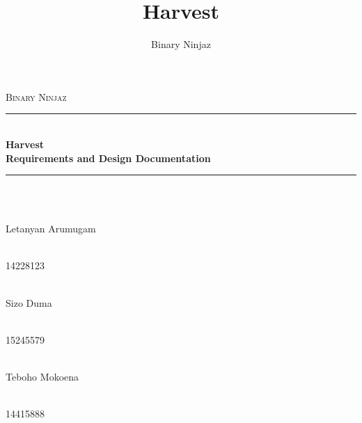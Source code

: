 \documentclass[11pt]{article}
\author{Binary Ninjaz}
\title{Harvest}
\begin{document}
\begin{titlepage}

	\begin{center}
		\textsc{\LARGE Binary Ninjaz}\\[0.3cm]
		\rule{\linewidth}{0.5mm} \\[0.5cm]
		{ \huge \bfseries Harvest \\
		  \vspace{0.3cm}\large \bfseries Requirements and Design Documentation}\\[0.5cm]
		\rule{\linewidth}{0.5mm} \\[1cm]


		\begin{minipage}{0.4\textwidth}
			\begin{flushleft} \large
				\emph{} \\
				Letanyan {Arumugam}
			\end{flushleft}
		\end{minipage}
		\begin{minipage}{0.4\textwidth}
			\begin{flushright} \large
				\emph{} \\
				14228123
			\end{flushright}
		\end{minipage}

		\begin{minipage}{0.4\textwidth}
			\begin{flushleft} \large
            	\emph{} \\
				Sizo {Duma}
			\end{flushleft}
		\end{minipage}
		\begin{minipage}{0.4\textwidth}
			\begin{flushright} \large
				\emph{} \\
				15245579
			\end{flushright}
		\end{minipage}

		\begin{minipage}{0.4\textwidth}
			\begin{flushleft} \large
				\emph{} \\
				Teboho {Mokoena}
			\end{flushleft}
		\end{minipage}
		\begin{minipage}{0.4\textwidth}
			\begin{flushright} \large
				\emph{} \\
				14415888
			\end{flushright}
		\end{minipage}


\end{center}
\end{titlepage}
\end{document}
